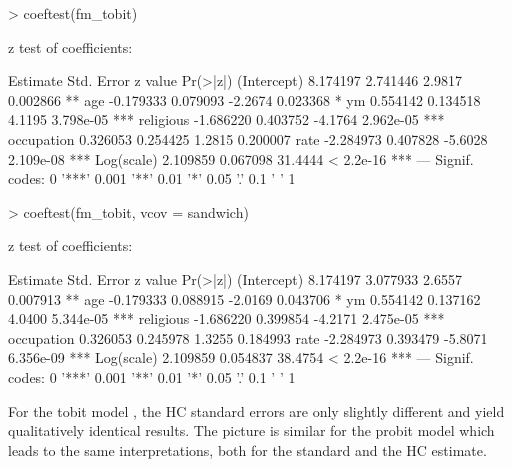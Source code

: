 \documentclass{Z}
\begin{document}
\begin{Schunk}
\begin{Sinput}
> coeftest(fm_tobit)
\end{Sinput}
\begin{Soutput}
z test of coefficients:

             Estimate Std. Error z value  Pr(>|z|)    
(Intercept)  8.174197   2.741446  2.9817  0.002866 ** 
age         -0.179333   0.079093 -2.2674  0.023368 *  
ym           0.554142   0.134518  4.1195 3.798e-05 ***
religious   -1.686220   0.403752 -4.1764 2.962e-05 ***
occupation   0.326053   0.254425  1.2815  0.200007    
rate        -2.284973   0.407828 -5.6028 2.109e-08 ***
Log(scale)   2.109859   0.067098 31.4444 < 2.2e-16 ***
---
Signif. codes:  0 '***' 0.001 '**' 0.01 '*' 0.05 '.' 0.1 ' ' 1 
\end{Soutput}
\begin{Sinput}
> coeftest(fm_tobit, vcov = sandwich)
\end{Sinput}
\begin{Soutput}
z test of coefficients:

             Estimate Std. Error z value  Pr(>|z|)    
(Intercept)  8.174197   3.077933  2.6557  0.007913 ** 
age         -0.179333   0.088915 -2.0169  0.043706 *  
ym           0.554142   0.137162  4.0400 5.344e-05 ***
religious   -1.686220   0.399854 -4.2171 2.475e-05 ***
occupation   0.326053   0.245978  1.3255  0.184993    
rate        -2.284973   0.393479 -5.8071 6.356e-09 ***
Log(scale)   2.109859   0.054837 38.4754 < 2.2e-16 ***
---
Signif. codes:  0 '***' 0.001 '**' 0.01 '*' 0.05 '.' 0.1 ' ' 1 
\end{Soutput}
\end{Schunk}

For the tobit model , the HC standard errors are only slightly
different and yield qualitatively identical results. The picture is similar for
the probit model  which leads to the same interpretations, both
for the standard and the HC estimate.
\end{document}
